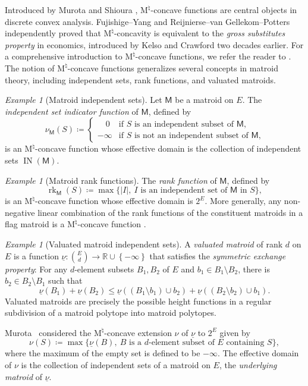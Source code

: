 \documentclass{amsart}
\theoremstyle{definition}
\theoremstyle{remark}
\newtheorem{example}[theorem]{Example}
\newcommand{\abs}[1]{\left|#1\right|}               %
\newcommand{\set}[1]{\left\{#1\right\}}             %
\newcommand{\R}{\mathbb{R}}
\newcommand{\M}{\mathsf{M}}    %
\DeclareMathOperator{\rk}{rk}       %
\DeclareMathOperator{\IN}{{IN}}
\newcommand{\1}{\mathbf{1}}
\newcommand{\Mnat}{$\text{M}^\natural$}
\numberwithin{equation}{section}
\begin{document}
Introduced by Murota and Shioura \cite{MS99}, \Mnat-concave functions are central objects in discrete convex analysis.
Fujishige--Yang \cite{FY03} and Reijnierse--van Gellekom--Potters \cite{Re02} independently proved that \Mnat-concavity is equivalent to the \emph{gross substitutes property} in economics, introduced by Kelso and Crawford \cite{KC82} two decades earlier.
For a comprehensive introduction to \Mnat-concave functions, we refer the reader to \cite[Chapter 6]{Mu03}. 
The notion of 
\Mnat-concave functions generalizes several concepts in matroid theory, including independent sets, rank functions, and valuated matroids.


\begin{example}[Matroid independent sets] \label{ex:ordinary}
	Let $\M$ be a matroid  on ${E}$. The \emph{independent set indicator function} of $\M$, defined by
    \[
	\nu_\M (S) \coloneqq \begin{cases}
		\quad 0 &\text{if $S$ is an independent subset of $\M$,}\\
		-\infty &\text{if $S$ is not an independent subset of $\M$,}
	\end{cases}
	\]
    is an \Mnat-concave function whose effective domain is
the collection of independent sets $\IN(\M)$.
\end{example}

\begin{example}[Matroid rank functions]\label{ex:rank}
The \emph{rank function} of $\M$, defined by
    \[
    \rk_\M(S) \coloneqq \max\Big\{\abs{I}, \ \text{$I$ is an independent set of $\M$ in $S$}\Big\},
    \]
    is an \Mnat-concave function whose effective domain  is  $2^{E}$. 
    More generally, any non-negative linear combination of the rank functions of the constituent matroids in a flag matroid is a \Mnat-concave function \cite[Theorem 3]{Sh12}. 
\end{example}

\begin{example}[Valuated matroid independent sets]\label{ex:valuated}
    A \emph{valuated matroid} of rank $d$ on $E$ is a function  $\underline{\nu}\colon {E\choose d}\to \R\cup\set{-\infty}$ 
    that satisfies the \emph{symmetric exchange property}: For any $d$-element subsets $B_1,B_2$ of $E$ and $b_1\in B_1\setminus B_2$, there is $b_2\in B_2\setminus B_1$ such that
    \[
    \underline{\nu}(B_1)+\underline{\nu}(B_2)\leq
    \underline{\nu}((B_1\setminus b_1)\cup b_2)+\underline{\nu}((B_2\setminus b_2)\cup b_1).
    \]
    Valuated matroids are precisely the possible height functions in a regular subdivision of a matroid polytope into matroid polytopes. \cite{Speyer}
 
Murota~\cite{Mu97} considered the  \Mnat-concave extension $ \nu$ of $\underline{\nu}$ to $2^{E}$ given by
\[
    \nu(S)\coloneqq \max\Big\{\underline{\nu}(B), \  \text{$B$ is a $d$-element subset of $E$ containing $S$}\Big\},
\]
where the maximum of the empty set is defined to be $-\infty$. The effective domain of $\nu$ is the collection of independent sets of a matroid on $E$, the \emph{underlying matroid} of $\underline{\nu}$.
\end{example}
\end{document}
